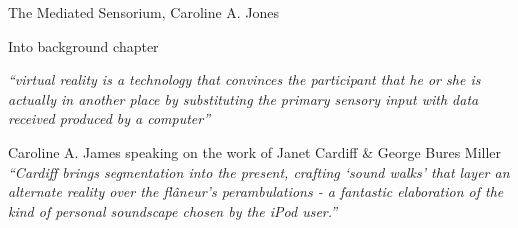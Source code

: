 The Mediated Sensorium, Caroline A. Jones




Into background chapter

\textit{``virtual reality is a technology that convinces the participant that he or she is actually in another place by substituting the primary sensory input with data received produced by a computer''}~\cite{Heim1998}




Caroline A. James speaking on the work of Janet Cardiff \& George Bures Miller
\textit{``Cardiff brings segmentation into the present, crafting `sound walks' that layer an alternate reality over the fl\^aneur's perambulations - a fantastic elaboration of the kind of personal soundscape chosen by the iPod user.''}

